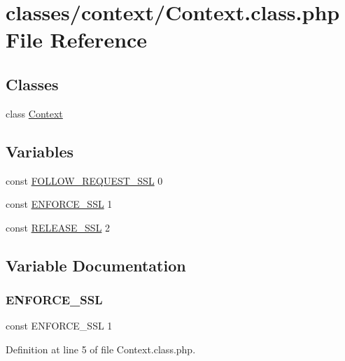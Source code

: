 \hypertarget{Context_8class_8php}{}\section{classes/context/\+Context.class.\+php File Reference}
\label{Context_8class_8php}
\subsection*{Classes}
\begin{DoxyCompactItemize}
\item 
class \hyperlink{classContext}{Context}
\end{DoxyCompactItemize}
\subsection*{Variables}
\begin{DoxyCompactItemize}
\item 
const \hyperlink{Context_8class_8php_a546ef85538017b41b2928e818066989d}{F\+O\+L\+L\+O\+W\+\_\+\+R\+E\+Q\+U\+E\+S\+T\+\_\+\+S\+SL} 0
\item 
const \hyperlink{Context_8class_8php_aa778d0999efa2a353d4d0876fd0f9f7b}{E\+N\+F\+O\+R\+C\+E\+\_\+\+S\+SL} 1
\item 
const \hyperlink{Context_8class_8php_a435293ef88053f90feaa2abf807fb6a3}{R\+E\+L\+E\+A\+S\+E\+\_\+\+S\+SL} 2
\end{DoxyCompactItemize}


\subsection{Variable Documentation}
\mbox{\label{Context_8class_8php_aa778d0999efa2a353d4d0876fd0f9f7b}} 
\subsubsection{\texorpdfstring{E\+N\+F\+O\+R\+C\+E\+\_\+\+S\+SL}{ENFORCE\_SSL}}
{\footnotesize\ttfamily const E\+N\+F\+O\+R\+C\+E\+\_\+\+S\+SL 1}



Definition at line 5 of file Context.\+class.\+php.

